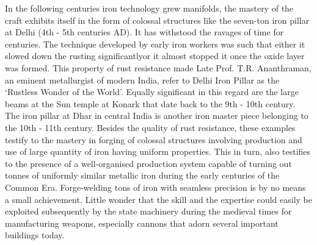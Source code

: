 In the following centuries iron technology grew manifolds, the mastery of the craft exhibits itself in the form of colossal structures like the seven-ton iron pillar at Delhi (4th - 5th centuries AD). It has withstood the ravages of time for centuries. The technique developed by early iron workers was such that either it slowed down the rusting significantlyor it almost stopped it once the oxide layer was formed. This property of rust resistance made Late Prof. T.R. Ananthraman, an eminent metallurgist of modern India, refer to Delhi Iron Pillar as the `Rustless Wonder of the World'. Equally significant in this regard are the large beams at the Sun temple at Konark that date back to the 9th - 10th century. The iron pillar at Dhar in central India is another iron master piece belonging to the 10th - 11th century. Besides the quality of rust resistance, these examples testify to the mastery in forging of colossal structures involving production and use of large quantity of iron having uniform properties. This in turn, also testifies to the presence of a well-organised production system capable of turning out tonnes of uniformly similar metallic iron during the early centuries of the Common Era. Forge-welding tons of iron with seamless precision is by no means a small achievement. Little wonder that the skill and the expertise could easily be exploited subsequently by the state machinery during the medieval times for manufacturing weapons, especially cannons that adorn several important buildings today.

